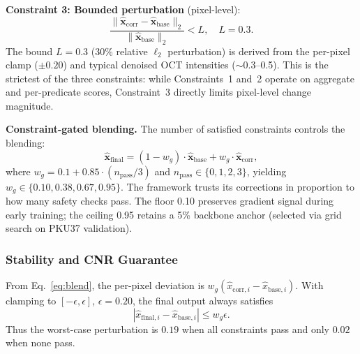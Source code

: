 \documentclass{ieeetj}
\begin{document}
\textbf{Constraint 3: Bounded perturbation} (pixel-level):
\begin{equation}
\frac{\|\hat{\mathbf{x}}_\text{corr} - \hat{\mathbf{x}}_\text{base}\|_2}{\|\hat{\mathbf{x}}_\text{base}\|_2} < L, \quad L = 0.3.
\label{eq:bounded_perturbation}
\end{equation}
The bound $L = 0.3$ (30\% relative $\ell_2$ perturbation) is derived from the per-pixel clamp ($\pm 0.20$) and typical denoised OCT intensities (${\sim}$0.3--0.5). This is the strictest of the three constraints: while Constraints~1 and~2 operate on aggregate and per-predicate scores, Constraint~3 directly limits pixel-level change magnitude.

\textbf{Constraint-gated blending.} The number of satisfied constraints controls the blending:
\begin{equation}
\hat{\mathbf{x}}_\text{final} = (1 - w_g) \cdot \hat{\mathbf{x}}_\text{base} + w_g \cdot \hat{\mathbf{x}}_\text{corr},
\label{eq:blend}
\end{equation}
where $w_g = 0.1 + 0.85 \cdot (n_\text{pass}/3)$ and $n_\text{pass} \in \{0,1,2,3\}$, yielding $w_g \in \{0.10, 0.38, 0.67, 0.95\}$. The framework trusts its corrections in proportion to how many safety checks pass. The floor 0.10 preserves gradient signal during early training; the ceiling 0.95 retains a 5\% backbone anchor (selected via grid search on PKU37 validation).

\subsubsection{Stability and CNR Guarantee}

From Eq.~\eqref{eq:blend}, the per-pixel deviation is $w_g(\hat{x}_{\mathrm{corr},i}-\hat{x}_{\mathrm{base},i})$. With clamping to $[-\epsilon,\epsilon]$, $\epsilon=0.20$, the final output always satisfies
\begin{equation}
|\hat{x}_{\mathrm{final},i}-\hat{x}_{\mathrm{base},i}| \le w_g\epsilon.
\label{eq:pixel_bound}
\end{equation}
Thus the worst-case perturbation is $0.19$ when all constraints pass and only $0.02$ when none pass.
\end{document}
